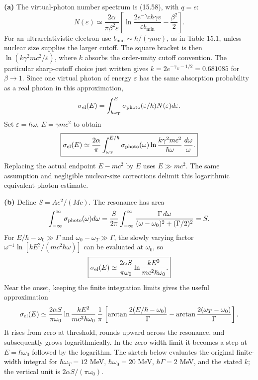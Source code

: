 \medskip\noindent\textbf{(a)} The virtual-photon number spectrum is
(15.58), with $q=e$:
\[
N(\varepsilon)\simeq\frac{2\alpha}{\pi\beta^2\varepsilon}
\left[\ln\frac{2e^{-\gamma_E}\hbar\gamma v}{\varepsilon b_{\min}}
-\frac{\beta^2}{2}\right].
\]
For an ultrarelativistic electron use $b_{\min}\sim\hbar/(\gamma mc)$,
as in Table 15.1, unless nuclear size supplies the larger cutoff.
The square bracket is then $\ln(k\gamma^2mc^2/\varepsilon)$,
where $k$ absorbs the order-unity cutoff convention.  The particular
sharp-cutoff choice just written gives
$k=2e^{-\gamma_E-1/2}=0.681085$ for $\beta\to1$.
Since one virtual photon of energy $\varepsilon$ has the same
absorption probability as a real photon in this approximation,
\[
\sigma_{\rm el}(E)=\int_{\hbar\omega_T}^{E}
 \sigma_{\rm photo}(\varepsilon/\hbar)N(\varepsilon)d\varepsilon.
\]
Set $\varepsilon=\hbar\omega$, $E=\gamma mc^2$ to obtain
\[
\boxed{\sigma_{\rm el}(E)\simeq\frac{2\alpha}{\pi}
\int_{\omega_T}^{E/\hbar}\sigma_{\rm photo}(\omega)
 \ln\frac{k\gamma^2mc^2}{\hbar\omega}\,\frac{d\omega}{\omega}.}
\]
Replacing the actual endpoint $E-mc^2$ by $E$ uses $E\gg mc^2$.
The same assumption and negligible nuclear-size corrections delimit
this logarithmic equivalent-photon estimate.

\medskip\noindent\textbf{(b)} Define $S=Ae^2/(Mc)$.
The resonance has area
\[
\int_{-\infty}^{\infty}\sigma_{\rm photo}(\omega)d\omega
=\frac{S}{2\pi}\int_{-\infty}^{\infty}
 \frac{\Gamma\,d\omega}{(\omega-\omega_0)^2+(\Gamma/2)^2}=S.
\]
For $E/\hbar-\omega_0\gg\Gamma$ and
$\omega_0-\omega_T\gg\Gamma$, the slowly varying factor
$\omega^{-1}\ln[kE^2/(mc^2\hbar\omega)]$ can be evaluated at
$\omega_0$, so
\[
\boxed{\sigma_{\rm el}(E)\simeq
\frac{2\alpha S}{\pi\omega_0}
 \ln\frac{kE^2}{mc^2\hbar\omega_0}.}
\]
Near the onset, keeping the finite integration limits gives the
useful approximation
\[
\sigma_{\rm el}(E)\simeq\frac{2\alpha S}{\pi\omega_0}
 \ln\frac{kE^2}{mc^2\hbar\omega_0}\,
\frac1\pi\left[
 \arctan\frac{2(E/\hbar-\omega_0)}\Gamma
-\arctan\frac{2(\omega_T-\omega_0)}\Gamma\right].
\]
It rises from zero at threshold, rounds upward across the resonance,
and subsequently grows logarithmically.  In the zero-width limit
it becomes a step at $E=\hbar\omega_0$ followed by the logarithm.
The sketch below evaluates the original finite-width integral for
$\hbar\omega_T=12$ MeV, $\hbar\omega_0=20$ MeV,
$\hbar\Gamma=2$ MeV, and the stated $k$; the vertical unit is
$2\alpha S/(\pi\omega_0)$.
\begin{center}\end{center}

